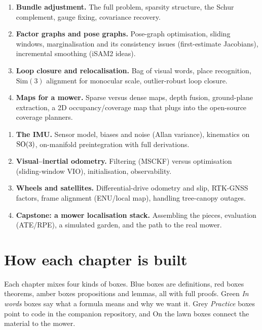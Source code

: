 \begin{description}[leftmargin=1.5em,style=nextline]
\begin{enumerate}[label=\arabic*.,leftmargin=2em,start=8]
  \item \textbf{Bundle adjustment.} The full problem, sparsity structure,
    the Schur complement, gauge fixing, covariance recovery.
  \item \textbf{Factor graphs and pose graphs.} Pose-graph optimisation,
    sliding windows, marginalisation and its consistency issues
    (first-estimate Jacobians), incremental smoothing (iSAM2 ideas).
  \item \textbf{Loop closure and relocalisation.} Bag of visual words,
    place recognition, $\mathrm{Sim}(3)$ alignment for monocular scale,
    outlier-robust loop closure.
  \item \textbf{Maps for a mower.} Sparse versus dense maps, depth fusion,
    ground-plane extraction, a 2D occupancy/coverage map that plugs into
    the open-source  coverage planners.
  \end{enumerate}
\item[Part IV --- Fusion for the garden]
  \begin{enumerate}[label=\arabic*.,leftmargin=2em,start=12]
  \item \textbf{The IMU.} Sensor model, biases and noise (Allan variance),
    kinematics on $\mathrm{SO}(3)$, on-manifold preintegration with full derivations.
  \item \textbf{Visual--inertial odometry.} Filtering (MSCKF) versus
    optimisation (sliding-window VIO), initialisation, observability.
  \item \textbf{Wheels and satellites.} Differential-drive odometry and
    slip, RTK-GNSS factors, frame alignment (ENU/local map), handling
    tree-canopy outages.
  \item \textbf{Capstone: a mower localisation stack.} Assembling the
    pieces, evaluation (ATE/RPE), a simulated garden, and the path to the
    real mower.
  \end{enumerate}
\end{description}

\section*{How each chapter is built}

Each chapter mixes four kinds of boxes. \textcolor{defblue}{Blue} boxes
are definitions, \textcolor{thmred}{red} boxes theorems,
\textcolor{propamber}{amber} boxes propositions and lemmas, all with full
proofs. \textcolor{wordsgreen}{Green} \emph{In words} boxes say what a
formula means and why we want it. Grey \emph{Practice} boxes point to code
in the companion repository, and \textcolor{lawngreen!70!black}{On the
lawn} boxes connect the material to the mower.

